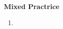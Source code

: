 \documentclass{article}[12pt, a4paper]
\begin{document}
\centering \textbf{Mixed Practrice}
\begin{enumerate}
\item  


\end{enumerate}
\end{document}
